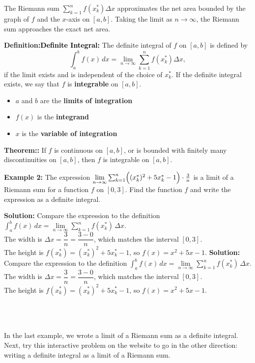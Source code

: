 \documentclass[12pt]{article}
\renewcommand{\lim}{\mathop{\mathrm{lim}}\limits}
\newcommand{\mathvidartifact}[1]{%
  \ifdefined\tagpdfmc
    \tagpdfmc{artifact}#1\tagpdfmcend
  \else
    #1%
  \fi
}
\newcommand{\msColor}[2]{\textcolor{#1}{#2}}
\newcommand{\msDef}[1]{\textbf{\msColor{TextBlue}{Definition}}\if\relax\detokenize{#1}\relax\textbf{\msColor{black}{:}}\else\textbf{\;\msColor{black}{#1:}}\fi}
\newcommand{\msThm}[1]{\textbf{\msColor{TextTeal}{Theorem}}\if\relax\detokenize{#1}\relax\textbf{\msColor{black}{:}}\else\textbf{\;\msColor{black}{#1:}}\fi}
\newcommand{\prenotephantom}[1]{\mathvidartifact{\begingroup\color{white}#1\endgroup}}
\begin{document}
\newpage

The Riemann sum $\sum_{k=1}^n f(x_k^*) \Delta x$ approximates the net area bounded by the graph of $f$ and the $x$-axis on $[a,b]$. 
Taking the limit as $n \to \infty$, the Riemann sum approaches the exact net area.

\msDef{Definite Integral}
The definite integral of $f$ on $[a,b]$ is defined by
\[ \int_a^b f(x) \, dx = \lim_{n \to \infty} \sum_{k=1}^n f(x_k^*) \Delta x, \]
if the limit exists and is independent of the choice of $x_k^*$. 
If the definite integral exists, we say that $f$ is \textbf{integrable} on $[a,b]$.

\begin{itemize}
\item $a$ and $b$ are the \textbf{limits of integration}
\item $f(x)$ is the \textbf{integrand}
\item $x$ is the \textbf{variable of integration}
\end{itemize}

\msThm{} If $f$ is continuous on $[a,b]$, or is bounded with finitely many discontinuities on $[a,b]$, then $f$ is integrable on $[a,b]$.

\vfill

\textbf{Example 2: } 
The expression 
$\lim_{n \to \infty} \sum_{k=1}^n \Bigl((x_k^*)^2 + 5x_k^* - 1 \Bigr) \cdot \frac{3}{n}$ 
is a limit 
of a Riemann sum 
for a function $f$ 
on $[0,3]$.
Find the function $f$ 
and write the expression 
as a definite integral.

\prenotephantom{\textbf{Solution: } Compare the expression to the definition $\displaystyle\int_a^b f(x)\,dx = \lim_{n \to \infty} \sum_{k=1}^n f(x_k^*)\,\Delta x$. \\[0.1cm]
The width is $\Delta x = \dfrac{3}{n} = \dfrac{3-0}{n}$, which matches the interval $[0,3]$. \\[0.1cm]
The height is $f(x_k^*) = (x_k^*)^2 + 5x_k^* - 1$, so $f(x) = x^2 + 5x - 1$.}

\begin{align*}
\phantom{\lim_{n \to \infty} \sum_{k=1}^n \Bigl((x_k^*)^2 + 5x_k^* - 1\Bigr)\cdot \frac{3}{n} = \int_0^3 \bigl(x^2 + 5x - 1\bigr) \,dx}
\end{align*}

\vfill

\newpage

In the last example, we wrote a limit of a Riemann sum as a definite integral.
Next, try this interactive problem on the website to go in the other direction: writing a definite integral as a limit of a Riemann sum.
\end{document}
